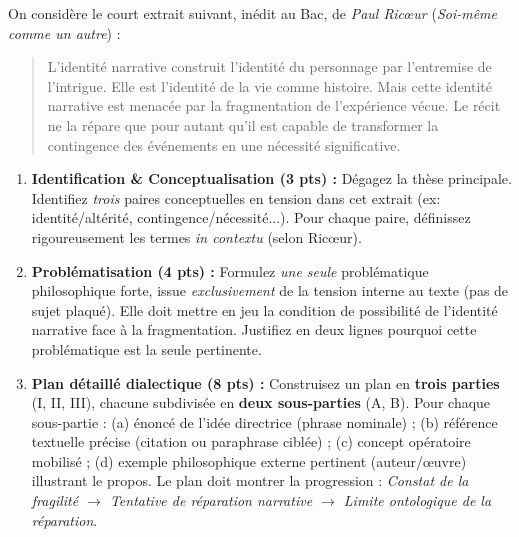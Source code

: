 \documentclass[11pt]{article}
\begin{document}
\begin{exercice}
On considère le court extrait suivant, inédit au Bac, de \textit{Paul Ricœur} (\textit{Soi-même comme un autre}) : 
\begin{quote}
\og L'identité narrative construit l'identité du personnage par l'entremise de l'intrigue. Elle est l'identité de la vie comme histoire. Mais cette identité narrative est menacée par la fragmentation de l'expérience vécue. Le récit ne la répare que pour autant qu'il est capable de transformer la contingence des événements en une nécessité significative. \fg
\end{quote}

\begin{enumerate}
    \item \textbf{Identification \& Conceptualisation (3 pts) :} Dégagez la thèse principale. Identifiez \textit{trois} paires conceptuelles en tension dans cet extrait (ex: identité/altérité, contingence/nécessité...). Pour chaque paire, définissez rigoureusement les termes \textit{in contextu} (selon Ricœur).
    \item \textbf{Problématisation (4 pts) :} Formulez \textit{une seule} problématique philosophique forte, issue \textit{exclusivement} de la tension interne au texte (pas de sujet plaqué). Elle doit mettre en jeu la condition de possibilité de l'identité narrative face à la fragmentation. Justifiez en deux lignes pourquoi cette problématique est la seule pertinente.
    \item \textbf{Plan détaillé dialectique (8 pts) :} Construisez un plan en \textbf{trois parties} (I, II, III), chacune subdivisée en \textbf{deux sous-parties} (A, B). Pour chaque sous-partie : (a) énoncé de l'idée directrice (phrase nominale) ; (b) référence textuelle précise (citation ou paraphrase ciblée) ; (c) concept opératoire mobilisé ; (d) exemple philosophique externe pertinent (auteur/œuvre) illustrant le propos. Le plan doit montrer la progression : \textit{Constat de la fragilité $\rightarrow$ Tentative de réparation narrative $\rightarrow$ Limite ontologique de la réparation}.
\end{enumerate}
\end{exercice}
\end{document}
